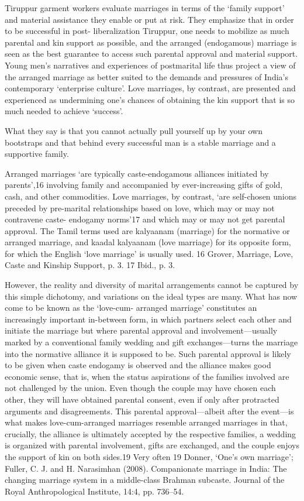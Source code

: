 \documentclass[a4paper, 11pt, onecolumn]{article}
\begin{document}
Tiruppur garment workers evaluate marriages
in terms of the ‘family support’ and material assistance they enable
or put at risk. They emphasize that in order to be successful in post-
liberalization Tiruppur, one needs to mobilize as much parental and
kin support as possible, and the arranged (endogamous) marriage
is seen as the best guarantee to access such parental approval
and material support. Young men’s narratives and experiences of
postmarital life thus project a view of the arranged marriage as
better suited to the demands and pressures of India’s contemporary
‘enterprise culture’. Love marriages, by contrast, are presented
and experienced as undermining one’s chances of obtaining the
kin support that is so much needed to achieve ‘success’.

What they say is that you cannot actually pull
yourself up by your own bootstraps and that behind every successful
man is a stable marriage and a supportive family. 

Arranged marriages ‘are typically caste-endogamous
alliances initiated by parents’,16 involving family and accompanied
by ever-increasing gifts of gold, cash, and other commodities. Love
marriages, by contrast, ‘are self-chosen unions preceded by pre-marital
relationships based on love, which may or may not contravene caste-
endogamy norms’17 and which may or may not get parental approval.
The Tamil terms used are kalyaanam (marriage) for the normative
or arranged marriage, and kaadal kalyaanam (love marriage) for its
opposite form, for which the English ‘love marriage’ is usually used.
16 Grover, Marriage, Love, Caste and Kinship Support, p. 3.
17 Ibid., p. 3.

However, the reality and diversity of marital arrangements cannot
be captured by this simple dichotomy, and variations on the ideal
types are many. What has now come to be known as the ‘love-cum-
arranged marriage’ constitutes an increasingly important in-between
form, in which partners select each other and initiate the marriage
but where parental approval and involvement—usually marked by a
conventional family wedding and gift exchanges—turns the marriage
into the normative alliance it is supposed to be. Such parental approval
is likely to be given when caste endogamy is observed and the alliance
makes good economic sense, that is, when the status aspirations of the
families involved are not challenged by the union. Even though the
couple may have chosen each other, they will have obtained parental
consent, even if only after protracted arguments and disagreements.
This parental approval—albeit after the event—is what makes
love-cum-arranged marriages resemble arranged marriages in that,
crucially, the alliance is ultimately accepted by the respective families,
a wedding is organized with parental involvement, gifts are exchanged,
and the couple enjoys the support of kin on both sides.19
Very often
19 Donner, ‘One’s own marriage’; Fuller, C. J. and H. Narasimhan (2008).
Companionate marriage in India: The changing marriage system in a middle-class
Brahman subcaste. Journal of the Royal Anthropological Institute, 14:4, pp. 736–54.
\end{document}
